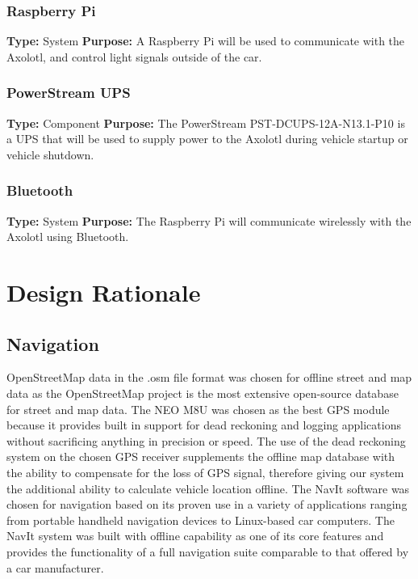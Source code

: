 \documentclass[onecolumn, draftclsnofoot,10pt, compsoc]{IEEEtran}
\begin{document}
\subsubsection{Raspberry Pi}
\textbf{Type:} System \newline
\textbf{Purpose:} A Raspberry Pi will be used to communicate with the Axolotl, and control light signals outside of the car.

\subsubsection{PowerStream UPS}
\textbf{Type:} Component \newline
\textbf{Purpose:} The PowerStream PST-DCUPS-12A-N13.1-P10 is a UPS that will be used to supply power to the Axolotl during vehicle startup or vehicle shutdown.

\subsubsection{Bluetooth}
\textbf{Type:} System \newline
\textbf{Purpose:} The Raspberry Pi will communicate wirelessly with the Axolotl using Bluetooth.

\newpage
\section{Design Rationale}
\subsection{Navigation}
OpenStreetMap data in the .osm file format was chosen for offline street and map data as the OpenStreetMap project is the most extensive open-source database for street and map data. The NEO M8U was chosen as the best GPS module because it provides built in support for dead reckoning and logging applications without sacrificing anything in precision or speed. The use of the dead reckoning system on the chosen GPS receiver supplements the offline map database with the ability to compensate for the loss of GPS signal, therefore giving our system the additional ability to calculate vehicle location offline.
The NavIt software was chosen for navigation based on its proven use in a variety of applications ranging from portable handheld navigation devices to Linux-based car computers. The NavIt system was built with offline capability as one of its core features and provides the functionality of a full navigation suite comparable to that offered by a car manufacturer.
\end{document}
